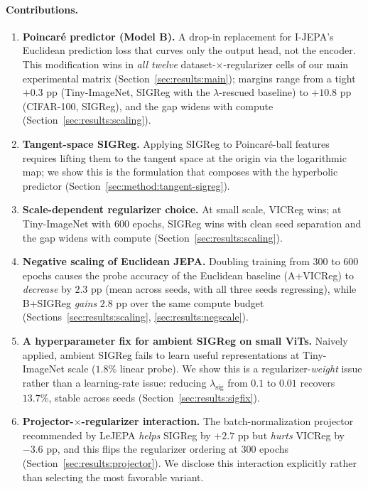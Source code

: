 \documentclass{article}
\begin{document}
\paragraph{Contributions.}
\begin{enumerate}
    \item \textbf{Poincar\'{e} predictor (Model B).} A drop-in replacement for I-JEPA's Euclidean prediction loss that curves only the output head, not the encoder. This modification wins in \emph{all twelve} dataset-$\times$-regularizer cells of our main experimental matrix (Section~\ref{sec:results:main}); margins range from a tight $+0.3$ pp (Tiny-ImageNet, SIGReg with the $\lambda$-rescued baseline) to $+10.8$ pp (CIFAR-100, SIGReg), and the gap widens with compute (Section~\ref{sec:results:scaling}).
    \item \textbf{Tangent-space SIGReg.} Applying SIGReg to Poincar\'{e}-ball features requires lifting them to the tangent space at the origin via the logarithmic map; we show this is the formulation that composes with the hyperbolic predictor (Section~\ref{sec:method:tangent-sigreg}).
    \item \textbf{Scale-dependent regularizer choice.} At small scale, VICReg wins; at Tiny-ImageNet with 600 epochs, SIGReg wins with clean seed separation and the gap widens with compute (Section~\ref{sec:results:scaling}).
    \item \textbf{Negative scaling of Euclidean JEPA.} Doubling training from 300 to 600 epochs causes the probe accuracy of the Euclidean baseline (A+VICReg) to \emph{decrease} by $2.3$ pp (mean across seeds, with all three seeds regressing), while B+SIGReg \emph{gains} $2.8$ pp over the same compute budget (Sections~\ref{sec:results:scaling}, \ref{sec:results:negscale}).
    \item \textbf{A hyperparameter fix for ambient SIGReg on small ViTs.} Naively applied, ambient SIGReg fails to learn useful representations at Tiny-ImageNet scale ($1.8\%$ linear probe). We show this is a regularizer-\emph{weight} issue rather than a learning-rate issue: reducing $\lambda_{\text{sig}}$ from $0.1$ to $0.01$ recovers $13.7\%$, stable across seeds (Section~\ref{sec:results:sigfix}).
    \item \textbf{Projector-$\times$-regularizer interaction.} The batch-normalization projector recommended by LeJEPA \emph{helps} SIGReg by $+2.7$ pp but \emph{hurts} VICReg by $-3.6$ pp, and this flips the regularizer ordering at 300 epochs (Section~\ref{sec:results:projector}). We disclose this interaction explicitly rather than selecting the most favorable variant.
\end{enumerate}
\end{document}
